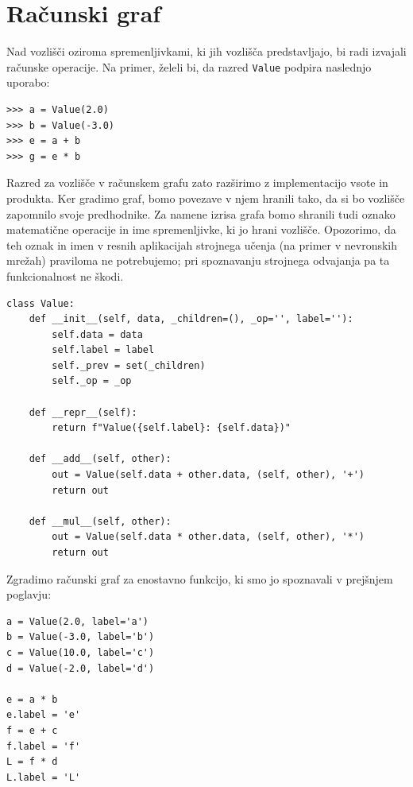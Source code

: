 \section{Računski graf}

Nad vozlišči oziroma spremenljivkami, ki jih vozlišča predstavljajo, bi radi
izvajali računske operacije. Na primer, želeli bi, da razred \texttt{Value}
podpira naslednjo uporabo:

\vspace*{3mm}
\begin{lstlisting}
>>> a = Value(2.0)
>>> b = Value(-3.0)
>>> e = a + b
>>> g = e * b
\end{lstlisting}

Razred za vozlišče v računskem grafu zato razširimo z implementacijo vsote in
produkta. Ker gradimo graf, bomo povezave v njem hranili tako, da si bo vozlišče
zapomnilo svoje predhodnike. Za namene izrisa grafa bomo shranili tudi oznako
matematične operacije in ime spremenljivke, ki jo hrani vozlišče. Opozorimo, da
teh oznak in imen v resnih aplikacijah strojnega učenja (na primer v nevronskih
mrežah) praviloma ne potrebujemo; pri spoznavanju strojnega odvajanja pa ta
funkcionalnost ne škodi.

\vspace*{3mm}
\begin{lstlisting}
class Value:
    def __init__(self, data, _children=(), _op='', label=''):
        self.data = data
        self.label = label
        self._prev = set(_children)
        self._op = _op

    def __repr__(self):
        return f"Value({self.label}: {self.data})"
    
    def __add__(self, other):
        out = Value(self.data + other.data, (self, other), '+')
        return out
    
    def __mul__(self, other):
        out = Value(self.data * other.data, (self, other), '*')
        return out
\end{lstlisting}

Zgradimo računski graf za enostavno funkcijo, ki smo jo spoznavali v prejšnjem
poglavju:

\vspace*{3mm}
\begin{lstlisting}
a = Value(2.0, label='a')
b = Value(-3.0, label='b')
c = Value(10.0, label='c')
d = Value(-2.0, label='d')

e = a * b
e.label = 'e'
f = e + c
f.label = 'f'
L = f * d
L.label = 'L'
\end{lstlisting}

